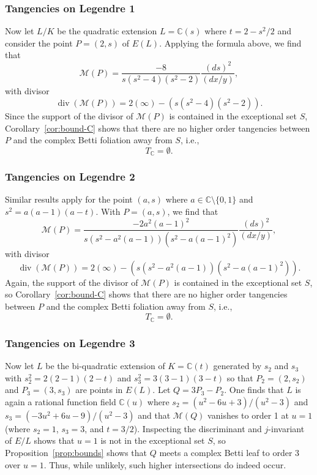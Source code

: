 \documentclass[12pt,reqno]{amsart}
\numberwithin{equation}{section}
\theoremstyle{plain}
\theoremstyle{definition}
\theoremstyle{remark}
\newcommand{\MM}{\mathcal{M}}
\newcommand{\C}{\mathbb{C}}
\newcommand{\<}{\langle}
\renewcommand{\>}{\rangle}
\DeclareMathOperator{\dvsr}{div}
\numberwithin{equation}{section}
\begin{document}
\subsubsection{Tangencies on Legendre 1}
  Now let $L/K$ be the quadratic extension $L=\C(s)$ where
  $t=2-s^2/2$ and consider the point $P=(2,s)$ of $E(L)$.  
  Applying the formula above, we find that
  \[\MM(P)=\frac{-8}{s(s^2-4)(s^2-2)}\frac{(ds)^2}{(dx/y)},\]
  with divisor
  \[\dvsr(\MM(P))=2(\infty)-(s(s^2-4)(s^2-2)).\]
  Since the support of the divisor of $\MM(P)$ is contained in the
  exceptional set $S$, Corollary~\ref{cor:bound-C} shows that there
  are no higher order tangencies between $P$ and the complex Betti
  foliation away from $S$, i.e.,
  \[T_\C=\emptyset.\]
  
\subsubsection{Tangencies on Legendre 2}
  Similar results apply for the point $(a,s)$ where
  $a\in\C\setminus\{0,1\}$ and $s^2=a(a-1)(a-t)$.  With $P=(a,s)$, 
we find that
\[\MM(P)=\frac{-2a^2(a-1)^2}{s\left(s^2-a^2(a-1)\right)\left(s^2-a(a-1)^2\right)}
  \frac{(ds)^2}{(dx/y)},\]
  with divisor
  \[\dvsr(\MM(P))=2(\infty)-(s(s^2-a^2(a-1))(s^2-a(a-1)^2)).\]
  Again, the support of the divisor of $\MM(P)$ is contained in the
  exceptional set $S$, so Corollary~\ref{cor:bound-C} shows that there
  are no higher order tangencies between $P$ and the complex Betti
  foliation away from $S$, i.e.,
  \[T_\C=\emptyset.\]

\subsubsection{Tangencies on Legendre 3}
Now let $L$ be the bi-quadratic extension of $K=\C(t)$ generated by
$s_2$ and $s_3$ with $s_2^2=2(2-1)(2-t)$ and $s_3^2=3(3-1)(3-t)$ so that
$P_2=(2,s_2)$ and $P_3=(3,s_3)$ are points in $E(L)$.  Let
$Q=3P_3-P_2$.  One finds that $L$ is
again a rational function field $\C(u)$ where $s_2=(u^2-6u+3)/(u^2-3)$
and $s_3=(-3u^2 + 6u - 9)/(u^2 - 3)$ and that
$\MM(Q)$ vanishes to order 1 at $u=1$ (where $s_2=1$, $s_3=3$,
and $t=3/2$).  Inspecting the discriminant and $j$-invariant of $E/L$
shows that $u=1$ is not in the exceptional set $S$, so
Proposition~\ref{prop:bounds} shows that $Q$ meets a complex Betti
leaf to order $3$ over $u=1$.  Thus, while unlikely, such higher
intersections do indeed occur.







\end{document}
